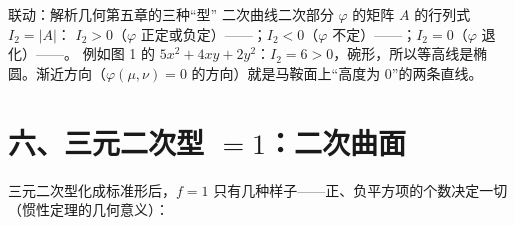 \documentclass[11pt,a4paper,oneside,openany,fontset=none]{ctexbook}
\begin{document}
\begin{gdbox}{联动：解析几何第五章的三种“型”}
二次曲线二次部分 $\varphi$ 的矩阵 $A$ 的行列式 $I_2=|A|$：
$I_2>0$（$\varphi$ 正定或负定）——；$I_2<0$（$\varphi$ 不定）——；$I_2=0$（$\varphi$ 退化）——。
例如图 1 的 $5x^2+4xy+2y^2$：$I_2=6>0$，碗形，所以等高线是椭圆。渐近方向（$\varphi(\mu,\nu)=0$ 的方向）就是马鞍面上“高度为 0”的两条直线。
\end{gdbox}

\section*{六、三元二次型 $=1$：二次曲面}

三元二次型化成标准形后，$f=1$ 只有几种样子——正、负平方项的个数决定一切（惯性定理的几何意义）：
\end{document}
